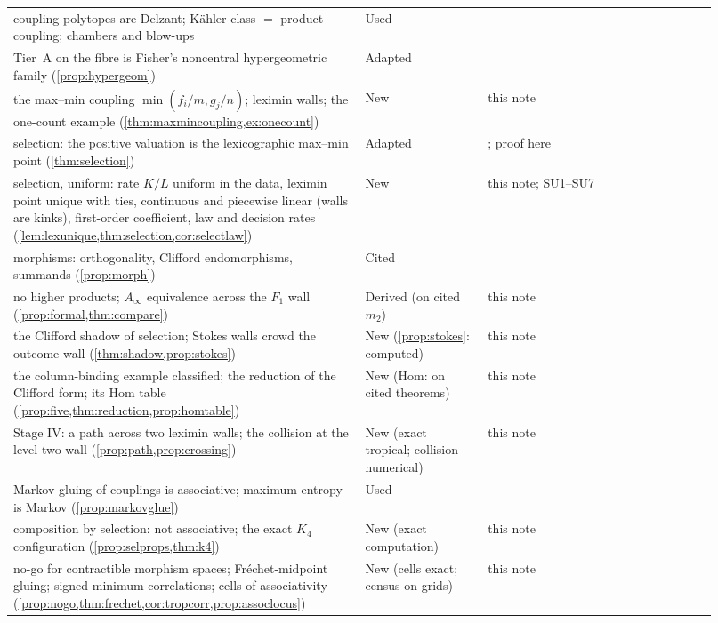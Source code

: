 \documentclass[11pt]{article}
\theoremstyle{definition}\newtheorem{definition}[theorem]{Definition}\newtheorem{remark}[theorem]{Remark}\newtheorem{example}[theorem]{Example}\newtheorem{problem}[theorem]{Open problem}\crefname{problem}{Problem}{Problems}
\begin{document}
{\begin{longtable}{p{0.46\linewidth}p{0.16\linewidth}p{0.3\linewidth}}
\rowcolor{stUsed} coupling polytopes are Delzant; K\"ahler class $=$ product coupling; chambers and blow-ups & Used & \cite{Awasthi2026Cpl}\\
\rowcolor{stAdapted} Tier~A on the fibre is Fisher's noncentral hypergeometric family (\cref{prop:hypergeom}) & Adapted & \cite{Fisher1935,BishopFienbergHolland1975}\\
\rowcolor{stNew} the max--min coupling $\min(f_i/m,g_j/n)$; leximin walls; the one-count example (\cref{thm:maxmincoupling,ex:onecount}) & New & this note\\
\rowcolor{stAdapted} selection: the positive valuation is the lexicographic max--min point (\cref{thm:selection}) & Adapted & \cite{FOOO2010,JuddRietsch2019,CominettiSanMartin1994}; proof here\\
\rowcolor{stNew} selection, uniform: rate $K/L$ uniform in the data, leximin point unique with ties, continuous and piecewise linear (walls are kinks), first-order coefficient, law and decision rates (\cref{lem:lexunique,thm:selection,cor:selectlaw}) & New & this note; SU1--SU7\\
\rowcolor{stCited} morphisms: orthogonality, Clifford endomorphisms, summands (\cref{prop:morph}) & Cited & \cite{ChoOh2006,Cho2005,Smith2018}\\
\rowcolor{stDerived} no higher products; $A_\infty$ equivalence across the $F_1$ wall (\cref{prop:formal,thm:compare}) & Derived (on cited $m_2$) & this note\\
\rowcolor{stNew} the Clifford shadow of selection; Stokes walls crowd the outcome wall (\cref{thm:shadow,prop:stokes}) & New (\ref{prop:stokes}: computed) & this note\\
\rowcolor{stNew} the column-binding example classified; the reduction of the Clifford form; its Hom table (\cref{prop:five,thm:reduction,prop:homtable}) & New (Hom: on cited theorems) & this note\\
\rowcolor{stNew} Stage IV: a path across two leximin walls; the collision at the level-two wall (\cref{prop:path,prop:crossing}) & New (exact tropical; collision numerical) & this note\\
\rowcolor{stUsed} Markov gluing of couplings is associative; maximum entropy is Markov (\cref{prop:markovglue}) & Used & \cite{Fritz2020}\\
\rowcolor{stNew} composition by selection: not associative; the exact $K_4$ configuration (\cref{prop:selprops,thm:k4}) & New (exact computation) & this note\\
\rowcolor{stNew} no-go for contractible morphism spaces; Fr\'echet-midpoint gluing; signed-minimum correlations; cells of associativity (\cref{prop:nogo,thm:frechet,cor:tropcorr,prop:assoclocus}) & New (cells exact; census on grids) & this note\\

\end{longtable}}
\end{document}
